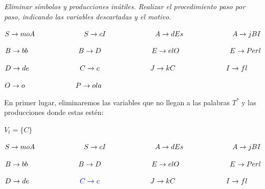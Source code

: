 \textit{Eliminar símbolos y producciones inútiles. Realizar el procedimiento paso por paso, indicando las variables descartadas y el motivo.} \newline

$ S \rightarrow moA \hspace{2.5cm} S \rightarrow cI \hspace{2.5cm} A \rightarrow  dEs \hspace{2.5cm} A \rightarrow  jBI $ \newline

$ B \rightarrow bb\hspace{2.5cm} B \rightarrow D\hspace{2.5cm} E \rightarrow  elO\hspace{2.5cm} E \rightarrow  Perl$ \newline

$ D \rightarrow de\hspace{2.5cm} C \rightarrow c\hspace{2.5cm} J \rightarrow  kC\hspace{2.5cm} I \rightarrow  fl$ \newline

$ O \rightarrow o\hspace{2.5cm} P \rightarrow ola$ \newline

En primer lugar, eliminaremos las variables que no llegan a las palabras $ T^{*} $ y las producciones donde estas estén: \newline

$ V_{t} = \{ C \} $ \newline

$ S \rightarrow moA \hspace{2.5cm} S \rightarrow cI \hspace{2.5cm} A \rightarrow  dEs \hspace{2.5cm} A \rightarrow  jBI $ \newline

$ B \rightarrow bb\hspace{2.5cm} B \rightarrow D\hspace{2.5cm} E \rightarrow  elO\hspace{2.5cm} E \rightarrow  Perl$ \newline

$ D \rightarrow de\hspace{2.5cm} \textcolor{blue}{ C \rightarrow c} \hspace{2.5cm} J \rightarrow  kC\hspace{2.5cm} I \rightarrow  fl$ \newline

